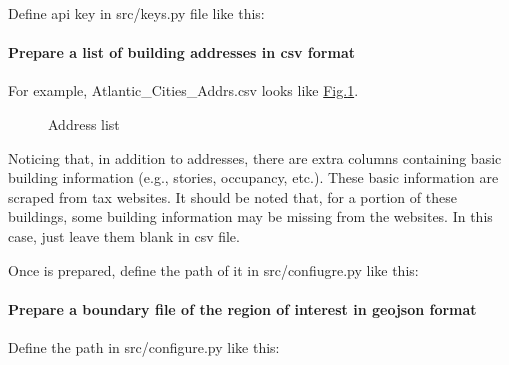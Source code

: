 \documentclass[letterpaper,10pt,english]{sphinxmanual}
\begin{document}
\sphinxAtStartPar
Define api key in src/keys.py file like this:

\begin{sphinxVerbatim}[commandchars=\\\{\}]
  
\end{sphinxVerbatim}


\paragraph{Prepare a list of building addresses in csv format}
\label{\detokenize{common/user_manual/preparedata:prepare-a-list-of-building-addresses-in-csv-format}}
\sphinxAtStartPar
For example, Atlantic\_Cities\_Addrs.csv looks like \hyperref[\detokenize{common/user_manual/preparedata:address-list}]{Fig.\@ \ref{\detokenize{common/user_manual/preparedata:address-list}}}.

\begin{figure}[htbp]
\centering
\capstart

\noindent{}
\caption{Address list}\label{\detokenize{common/user_manual/preparedata:id2}}\label{\detokenize{common/user_manual/preparedata:address-list}}\end{figure}

\sphinxAtStartPar
Noticing that, in addition to addresses, there are extra columns containing basic building information (e.g., stories, occupancy, etc.).
These basic information are scraped from tax websites.
It should be noted that, for a portion of these buildings, some building information may be missing from the websites.
In this case, just leave them blank in csv file.

\sphinxAtStartPar
Once  is prepared, define the path of it in src/confiugre.py like this:

\begin{sphinxVerbatim}[commandchars=\\\{\}]
  
\end{sphinxVerbatim}


\paragraph{Prepare a boundary file of the region of interest in geojson format}
\label{\detokenize{common/user_manual/preparedata:prepare-a-boundary-file-of-the-region-of-interest-in-geojson-format}}
\sphinxAtStartPar
Define the path in src/configure.py like this:
\end{document}
